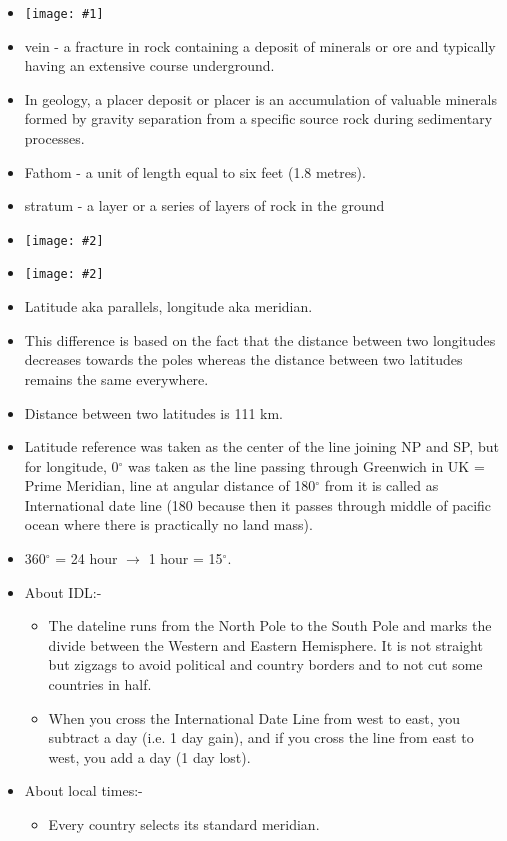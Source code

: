 \documentclass[8pt, a4paper, oneside, twocolumn]{extarticle}
\newcommand{\iph}[2]{
    \texttt{[image: \#2]}
}
\newcommand{\ph}[1]{
    \texttt{[image: \#1]}
}
\begin{document}
\begin{itemize}
  \item \ph{asia}
  \item vein - a fracture in rock containing a deposit of minerals or ore and typically having an extensive course underground.
  \item In geology, a placer deposit or placer is an accumulation of valuable minerals formed by gravity separation from a specific source rock during sedimentary processes.
  \item Fathom - a unit of length equal to six feet (1.8 metres).
  \item stratum - a layer or a series of layers of rock in the ground
  \item \iph{0.2}{syncanti}
  \item \iph{0.2}{latlon}
  \item Latitude aka parallels, longitude aka meridian.
  \item This difference is based on the fact that the distance between two longitudes decreases towards the poles whereas the distance between two latitudes remains the same everywhere.  
  \item Distance between two latitudes is 111 km.
  \item Latitude reference was taken as the center of the line joining NP and SP, but for longitude, 0$^\circ$ was taken as the line passing through Greenwich in UK = Prime Meridian, line at angular distance of 180$^\circ$ from it is called as International date line (180 because then it passes through middle of pacific ocean where there is practically no land mass).
  \item 360$^\circ$ = 24 hour $\rightarrow$ 1 hour = 15$^\circ$. 
  \item About IDL:-
  \begin{itemize}
    \item The dateline runs from the North Pole to the South Pole and marks the divide between the Western and Eastern Hemisphere. It is not straight but zigzags to avoid political and country borders and to not cut some countries in half.
    \item When you cross the International Date Line from west to east, you subtract a day (i.e. 1 day gain), and if you cross the line from east to west, you add a day (1 day lost).
  \end{itemize}
  \item About local times:-
  \begin{itemize}
    \item Every country selects its standard meridian.

\end{itemize}
\end{itemize}
\end{document}
